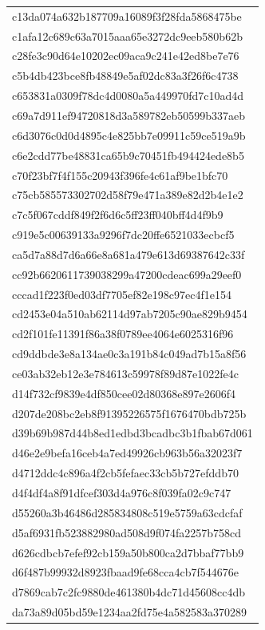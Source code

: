 \begin{tabular}{l}
c13da074a632b187709a16089f3f28fda5868475be \\
c1afa12c689c63a7015aaa65e3272dc9eeb580b62b \\
c28fe3c90d64e10202ec09aca9c241e42ed8be7e76 \\
c5b4db423bce8fb48849e5af02dc83a3f26f6c4738 \\
c653831a0309f78dc4d0080a5a449970fd7c10ad4d \\
c69a7d911ef94720818d3a589782eb50599b337aeb \\
c6d3076c0d0d4895c4e825bb7e09911c59ce519a9b \\
c6e2cdd77be48831ca65b9c70451fb494424ede8b5 \\
c70f23bf7f4f155c20943f396fe4c61af9be1bfc70 \\
c75cb585573302702d58f79e471a389e82d2b4e1e2 \\
c7c5f067cddf849f2f6d6c5ff23ff040bff4d4f9b9 \\
c919e5c00639133a9296f7dc20ffe6521033ecbcf5 \\
ca5d7a88d7d6a66e8a681a479e613d69387642c33f \\
cc92b6620611739038299a47200cdeac699a29eef0 \\
cccad1f223f0ed03df7705ef82e198c97ec4f1e154 \\
cd2453e04a510ab62114d97ab7205c90ae829b9454 \\
cd2f101fe11391f86a38f0789ee4064e6025316f96 \\
cd9ddbde3e8a134ae0c3a191b84c049ad7b15a8f56 \\
ce03ab32eb12e3e784613c59978f89d87e1022fe4c \\
d14f732cf9839e4df850cee02d80368e897e2606f4 \\
d207de208bc2eb8f91395226575f1676470bdb725b \\
d39b69b987d44b8ed1edbd3bcadbc3b1fbab67d061 \\
d46e2e9befa16ceb4a7ed49926cb963b56a32023f7 \\
d4712ddc4c896a4f2cb5fefaec33cb5b727efddb70 \\
d4f4df4a8f91dfcef303d4a976c8f039fa02c9c747 \\
d55260a3b46486d285834808c519e5759a63cdcfaf \\
d5af6931fb523882980ad508d9f074fa2257b758cd \\
d626cdbcb7efef92cb159a50b800ca2d7bbaf77bb9 \\
d6f487b99932d8923fbaad9fe68cca4cb7f544676e \\
d7869cab7c2fc9880de461380b4dc71d45608cc4db \\
da73a89d05bd59e1234aa2fd75e4a582583a370289 \\

\end{tabular}
